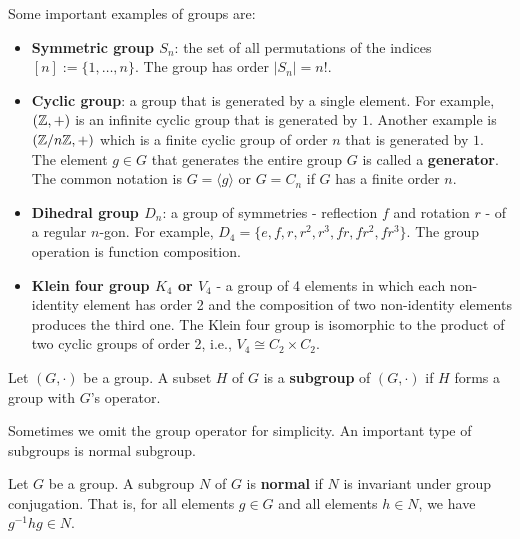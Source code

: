 \documentclass[../main.tex]{subfiles}
\begin{document}
Some important examples of groups are: 
\begin{itemize}
    \item \textbf{Symmetric group $S_n$}: the set of all permutations of the indices $[n]:=\{1,\dots,n\}$. The group has order $|S_n|=n!$.
    
    \item \textbf{Cyclic group}: a group that is generated by a single element. For example, $(\mathbb{Z}, +)$ is an infinite cyclic group that is generated by $1$. Another example is $(\mathbb{Z}/n\mathbb{Z}, +)$ which is a finite cyclic group of order $n$ that is generated by $1$. The element $g \in G$ that generates the entire group $G$ is called a \textbf{generator}. The common notation is $G=\langle g\rangle $ or $G=C_n$ if $G$ has a finite order $n$.
    
    \item \textbf{Dihedral group $D_n$}: a group of symmetries - reflection $f$ and rotation $r$ - of a regular $n$-gon. For example, $D_4=\{e, f, r, r^2, r^3, fr, fr^2, fr^3\}$. The group operation is function composition. 
    
    \item \textbf{Klein four group $K_4$ or $V_4$} - a group of 4 elements in which each non-identity element has order 2 and the composition of two non-identity elements produces the third one. The Klein four group is isomorphic to the product of two cyclic groups of order 2, i.e., $V_4 \cong C_2 \times C_2$.
    
    

\end{itemize}

\begin{definition}
Let $(G, \cdot)$ be a group. A subset $H$ of $G$ is a \textbf{subgroup} of $(G,\cdot)$ if $H$ forms a group with $G$'s operator. 
\end{definition}

Sometimes we omit the group operator for simplicity. An important type of subgroups is normal subgroup. 

\begin{definition}
Let $G$ be a group. A subgroup $N$ of $G$ is \textbf{normal} if $N$ is invariant under group conjugation.\reversemarginpar
{}
That is, for all elements $g \in G$ and all elements $h \in N$, we have $g^{-1}hg \in N$. 
\end{definition}
\end{document}
